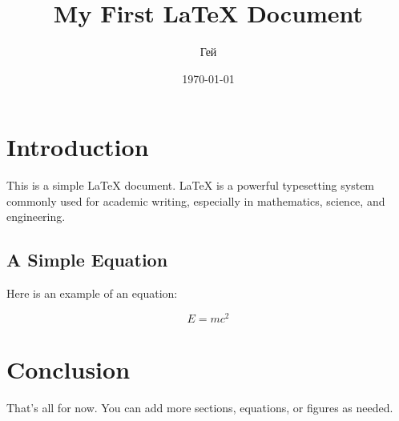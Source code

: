 \documentclass{article}
\title{My First LaTeX Document}
\author{Гей}
\date{\today}
\begin{document}
\maketitle

\section{Introduction}

This is a simple LaTeX document. LaTeX is a powerful typesetting system commonly used for academic writing, especially in mathematics, science, and engineering.

\subsection{A Simple Equation}

Here is an example of an equation:

\begin{equation}
    E = mc^2
\end{equation}

\section{Conclusion}

That's all for now. You can add more sections, equations, or figures as needed.
\end{document}
